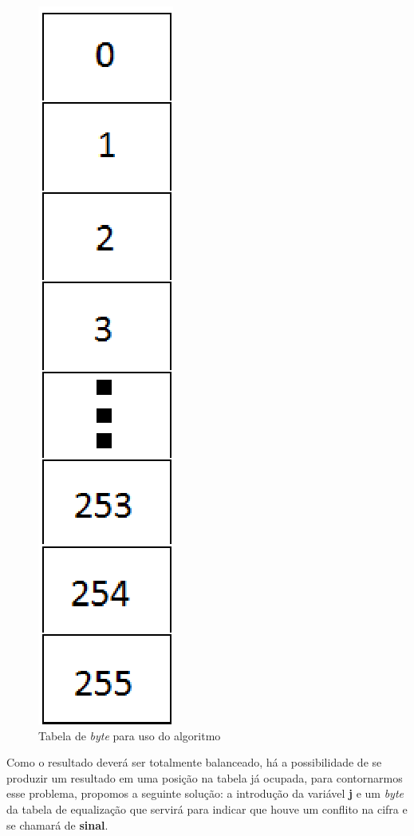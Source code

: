 \begin{figure}[h]
	\centering
	\includegraphics[scale=0.7]{figuras/tabela.eps}
	\caption{Tabela de \textit{byte} para uso do algoritmo}
\end{figure}

Como o resultado deverá ser totalmente balanceado, há a possibilidade de se produzir um resultado em uma posição na tabela já ocupada, para contornarmos esse problema, propomos a seguinte solução: a introdução da variável \textbf{j} e um \textit{byte} da tabela de equalização que servirá para indicar que houve um conflito na cifra e se chamará de \textbf{sinal}.

